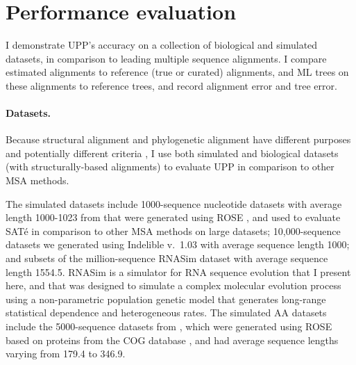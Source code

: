 \section{Performance evaluation}\label{upp:evaluation}
I demonstrate UPP's accuracy on a collection of biological
and simulated datasets, in comparison to leading multiple
sequence alignments. 
I compare estimated alignments 
to reference (true or curated) alignments, 
and ML trees on these alignments to 
reference trees, and record alignment error and tree error.

\paragraph{Datasets.} 
Because structural alignment and phylogenetic alignment
have different purposes and potentially different
criteria \cite{Reeck1987,goldman-benchmark}, I use both simulated and biological datasets (with structurally-based
alignments) to evaluate UPP in comparison to other MSA methods.


The simulated datasets include 1000-sequence nucleotide datasets 
with average length 1000-1023 
from \cite{Liu2009} that were
generated using ROSE \cite{ROSE}, and
used to evaluate SAT\'e in comparison
to other MSA methods on large datasets;  10,000-sequence datasets we
generated using Indelible v.~1.03 \cite{Fletcher01082009} with average
sequence length 1000;
and subsets of the million-sequence RNASim \cite{RNASim} dataset
with average sequence length 1554.5.
RNASim is a simulator for RNA sequence evolution
that I present here, 
and that was designed to simulate a complex molecular evolution process using
a non-parametric population genetic model that generates long-range statistical dependence
and heterogeneous rates.
The simulated AA datasets include the  5000-sequence datasets 
from \cite{Price2010}, which were
generated using ROSE based
on proteins from the COG database \cite{COG},  and had
average sequence lengths
varying from 179.4 to 346.9.


